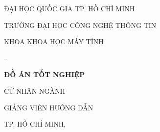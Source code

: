 \begin{titlepage}
\coverframe
\centering
{\fontsize{13}{16}\selectfont ĐẠI HỌC QUỐC GIA TP. HỒ CHÍ MINH\par}
{\fontsize{13}{16}\selectfont TRƯỜNG ĐẠI HỌC CÔNG NGHỆ THÔNG TIN\par}
\vspace{0.3cm}
{\fontsize{13}{16}\selectfont KHOA KHOA HỌC MÁY TÍNH\par}

\vfill
{\fontsize{14}{18}\selectfont \authorname{} -- \studentid\par}
\vspace{1.5cm}

{\fontsize{16}{20}\bfseries ĐỒ ÁN TỐT NGHIỆP\par}
\vspace{0.8cm}
{\fontsize{15}{20}\bfseries \thesistitle\par}
\vspace{0.4cm}
{\fontsize{13}{18}\itshape \thesistitleEN\par}

\vspace{1.5cm}
{\fontsize{14}{18}\selectfont CỬ NHÂN NGÀNH \MakeUppercase{\major}\par}

\vspace{1.2cm}
{\fontsize{13}{18}\selectfont GIẢNG VIÊN HƯỚNG DẪN\par}
{\fontsize{13}{18}\selectfont \advisor\par}

\vfill
{\fontsize{13}{16}\selectfont TP. HỒ CHÍ MINH, \thesisyear\par}
\end{titlepage}
